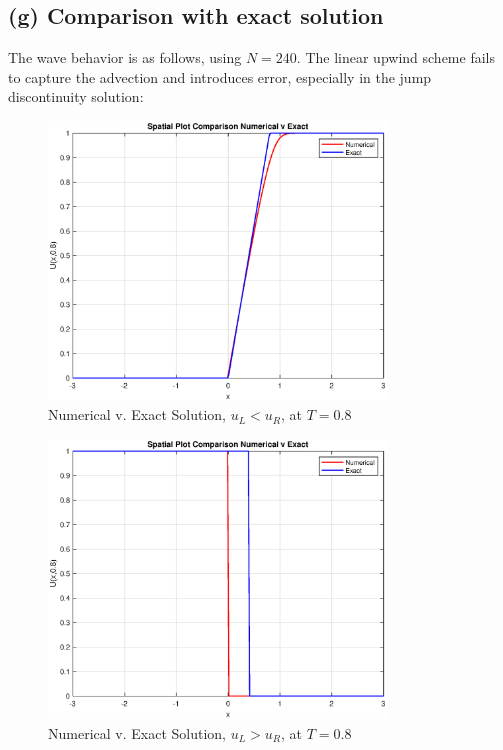 \documentclass[12pt]{article} %
\begin{document}
\subsection{(g) Comparison with exact solution}
\indent \indent The wave behavior is as follows, using $N = 240$. The linear upwind scheme fails to capture the advection and introduces error, especially in the jump discontinuity solution:
\begin{figure}[h!]
\caption{Numerical v. Exact Solution, $u_L < u_R$, at $T = 0.8$}
\centering
\includegraphics[width=0.8\textwidth]{p1g_compare1.eps}
\end{figure}

\begin{figure}[h!]
\caption{Numerical v. Exact Solution, $u_L > u_R$, at $T = 0.8$}
\centering
\includegraphics[width=0.8\textwidth]{1g_upwind_compare.eps}
\end{figure}
\end{document}
